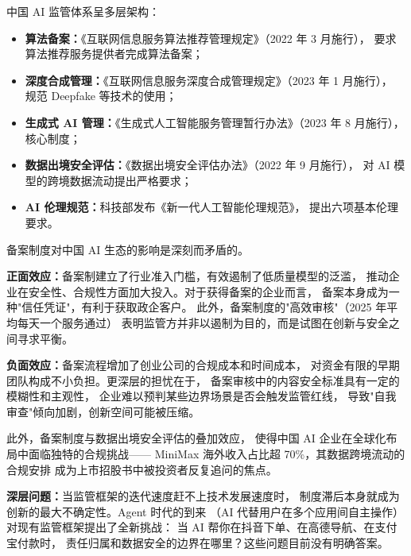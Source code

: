 中国 AI 监管体系呈多层架构：

\begin{itemize}
  \item \textbf{算法备案：}《互联网信息服务算法推荐管理规定》（2022 年 3 月施行），
    要求算法推荐服务提供者完成算法备案；
  \item \textbf{深度合成管理：}《互联网信息服务深度合成管理规定》（2023 年 1 月施行），
    规范 Deepfake 等技术的使用；
  \item \textbf{生成式 AI 管理：}《生成式人工智能服务管理暂行办法》（2023 年 8 月施行），
    核心制度；
  \item \textbf{数据出境安全评估：}《数据出境安全评估办法》（2022 年 9 月施行），
    对 AI 模型的跨境数据流动提出严格要求；
  \item \textbf{AI 伦理规范：}科技部发布《新一代人工智能伦理规范》，
    提出六项基本伦理要求。
\end{itemize}

\begin{warnbox}
备案制度对中国 AI 生态的影响是深刻而矛盾的。

\textbf{正面效应：}备案制建立了行业准入门槛，有效遏制了低质量模型的泛滥，
推动企业在安全性、合规性方面加大投入。对于获得备案的企业而言，
备案本身成为一种"信任凭证"，有利于获取政企客户。
此外，备案制度的"高效审核"（2025 年平均每天一个服务通过）
表明监管方并非以遏制为目的，而是试图在创新与安全之间寻求平衡。

\textbf{负面效应：}备案流程增加了创业公司的合规成本和时间成本，
对资金有限的早期团队构成不小负担。更深层的担忧在于，
备案审核中的内容安全标准具有一定的模糊性和主观性，
企业难以预判某些边界场景是否会触发监管红线，
导致"自我审查"倾向加剧，创新空间可能被压缩。

此外，备案制度与数据出境安全评估的叠加效应，
使得中国 AI 企业在全球化布局中面临独特的合规挑战——
MiniMax 海外收入占比超 70\%，其数据跨境流动的合规安排
成为上市招股书中被投资者反复追问的焦点。

\textbf{深层问题：}当监管框架的迭代速度赶不上技术发展速度时，
制度滞后本身就成为创新的最大不确定性。Agent 时代的到来
（AI 代替用户在多个应用间自主操作）对现有监管框架提出了全新挑战：
当 AI 帮你在抖音下单、在高德导航、在支付宝付款时，
责任归属和数据安全的边界在哪里？这些问题目前没有明确答案。
\end{warnbox}



